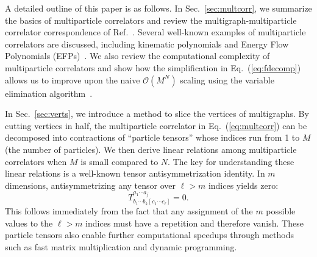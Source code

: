 \documentclass[aps,prd,floatfix,preprintnumbers,twocolumn,groupedaddress,nofootinbib,longbibliography,10pt]{revtex4-1}
\renewcommand{\O}{\mathcal{O}}
\DeclareRobustCommand{\Sec}[1]{Sec.~\ref{#1}}
\DeclareRobustCommand{\Eq}[1]{Eq.~(\ref{#1})}
\DeclareRobustCommand{\Ref}[1]{Ref.~\cite{#1}}
\begin{document}
A detailed outline of this paper is as follows.
%
In \Sec{sec:multcorr}, we summarize the basics of multiparticle correlators and review the multigraph-multiparticle correlator correspondence of \Ref{Komiske:2017aww}.
%
Several well-known examples of multiparticle correlators are discussed, including kinematic polynomials and Energy Flow Polynomials (EFPs)~\cite{Komiske:2017aww}.
%
We also review the computational complexity of multiparticle correlators and show how the simplification in \Eq{eq:fdecomp} allows us to improve upon the naive $\O(M^N)$ scaling using the variable elimination algorithm~\cite{Komiske:2017aww, zhang1996exploiting}.


In \Sec{sec:verts}, we introduce a method to slice the vertices of multigraphs.
%
By cutting vertices in half, the multiparticle correlator in \Eq{eq:multcorr} can be decomposed into contractions of ``particle tensors'' whose indices run from 1 to $M$ (the number of particles).
%
We then derive linear relations among multiparticle correlators when $M$ is small compared to $N$.
%
The key for understanding these linear relations is a well-known tensor antisymmetrization identity.
%
In $m$ dimensions, antisymmetrizing any tensor over $\ell>m$ indices yields zero:
%
\begin{equation}
\label{eq:antisymid}
T^{a_1\cdots a_j}_{b_1\cdots b_k [c_1 \cdots c_\ell]} = 0.
\end{equation}
%
This follows immediately from the fact that any assignment of the $m$ possible values to the $\ell > m$ indices must have a repetition and therefore vanish.
%
These particle tensors also enable further computational speedups through methods such as fast matrix multiplication and dynamic programming.
\end{document}
